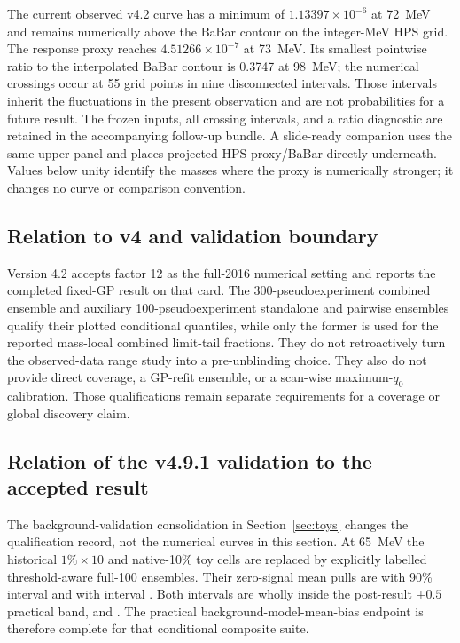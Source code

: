 The current observed v4.2 curve has a minimum of
$1.13397\times10^{-6}$ at 72~MeV and remains numerically above the BaBar
contour on the integer-MeV HPS grid.  The response proxy reaches
$4.51266\times10^{-7}$ at 73~MeV.  Its smallest pointwise ratio to the
interpolated BaBar contour is 0.3747 at 98~MeV; the numerical crossings occur
at 55 grid points in nine disconnected intervals.  Those intervals inherit
the fluctuations in the present observation and are not probabilities for a
future result.  The frozen inputs, all crossing intervals, and a ratio
diagnostic are retained in the accompanying follow-up bundle.  A slide-ready
companion uses the same upper panel and places
projected-HPS-proxy/BaBar directly underneath.  Values below unity identify
the masses where the proxy is numerically stronger; it changes no curve or
comparison convention.

\subsection{Relation to v4 and validation boundary}
\label{sec:results-v4p2-v4-context}

Version 4.2 accepts factor 12 as the full-2016 numerical setting and reports the
completed fixed-GP result on that card. The 300-pseudoexperiment combined
ensemble and auxiliary 100-pseudoexperiment standalone and pairwise ensembles
qualify their plotted conditional quantiles, while only the former is used for
the reported mass-local combined limit-tail fractions. They do not
retroactively turn the observed-data range study into a pre-unblinding choice.
They also do not provide direct \CLs{} coverage, a GP-refit ensemble, or a
scan-wise maximum-$q_0$ calibration. Those qualifications remain separate
requirements for a coverage or global discovery claim.

\subsection{Relation of the v4.9.1 validation to the accepted result}
\label{sec:results-v491-validation-boundary}

The background-validation consolidation in Section~\ref{sec:toys} changes the
qualification record, not the numerical curves in this section.  At 65~MeV the
historical $1\%\times10$ and native-10\% toy cells are replaced by explicitly
labelled threshold-aware full-100 ensembles.  Their zero-signal mean pulls are
\VFourPNineOneOnePctMean{} with 90\% interval
\VFourPNineOneOnePctMeanCI{} and \VFourPNineOneNativeTenMean{} with interval
\VFourPNineOneNativeTenMeanCI.  Both intervals are wholly inside the post-result
$\pm0.5$ practical band, and \VFourPNineOneCompositeMeanState.  The practical
background-model-mean-bias endpoint is therefore complete for that conditional
composite suite.

